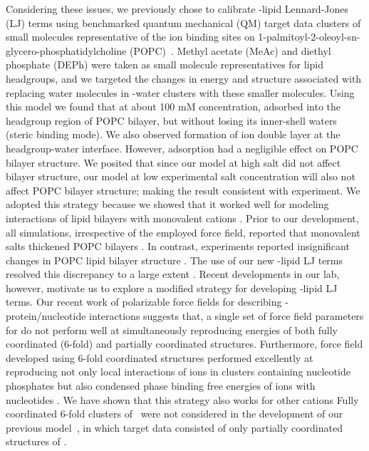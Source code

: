 Considering these issues, we previously chose to calibrate \mg{}-lipid Lennard-Jones (LJ) terms using 
benchmarked quantum mechanical (QM) target data clusters of small molecules representative of the
ion binding sites on 1-palmitoyl-2-oleoyl-sn-glycero-phosphatidylcholine (POPC)~\cite{saunders:2022}. 
Methyl acetate (MeAc) and diethyl phosphate (DEPh) were taken as small molecule representatives for lipid headgroups, 
and we targeted the changes in energy and structure associated with replacing water molecules in \mg{}-water clusters with these smaller molecules.  
Using this model we found that at about 100 mM concentration, \mg{} adsorbed into the headgroup region of POPC bilayer, 
but without losing its inner-shell waters (steric binding mode). We also observed formation of ion double layer at the headgroup-water interface.
However, \mg{} adsorption had a negligible effect on POPC bilayer structure. We posited that since our model at 
high salt did not affect bilayer structure, our model at low experimental salt concentration will also not affect POPC bilayer structure; making the result consistent with experiment. 
We adopted this strategy because we showed that it worked well for modeling interactions of lipid bilayers with monovalent cations \cite{saunders:2022}. Prior to our development, all simulations, irrespective of the employed force field, reported that monovalent salts thickened POPC bilayers \cite{sachs:2004,melcr:2018,jurkiewicz:2012,kruczek:2017}. 
In contrast, experiments reported insignificant changes in POPC lipid bilayer structure \cite{pabst:2007:rigidification,petrache:2006:swelling}. 
The use of our new \na-lipid LJ terms resolved this discrepancy to a large extent \cite{saunders:2022}. 
Recent developments in our lab, however, motivate us to explore a modified strategy for developing \mg-lipid LJ terms. 
Our recent work of polarizable force fields for describing \mg-protein/nucleotide interactions \cite{julian:2023:mg} 
suggests that, a single set of force field parameters for \mg{} do not perform well at simultaneously reproducing 
energies of both fully coordinated (6-fold)
and partially coordinated \mg{} structures. 
Furthermore, force field developed using 6-fold coordinated structures performed excellently at reproducing not only local interactions of 
\mg{} ions in clusters containing nucleotide phosphates but also condensed phase binding free energies of \mg{} ions with nucleotides \cite{julian:2023:mg}. 
We have shown that this strategy also works for other cations \cite{JACS2025} 
Fully coordinated 6-fold clusters of \mg~were not considered in the development of our previous \mg{} model~\cite{saunders:2024}, in which target data consisted of only partially coordinated structures of \mg{}.

